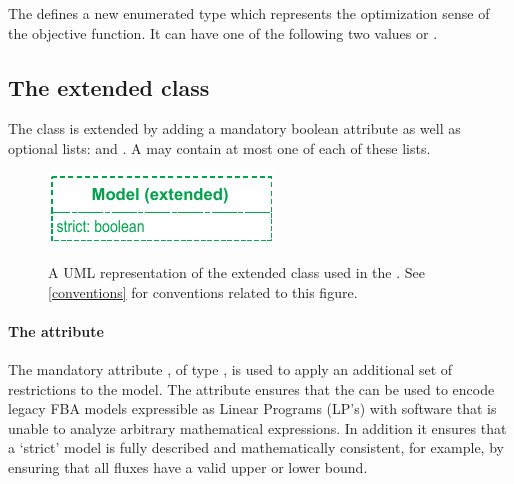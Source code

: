 The \FBCPackage defines a new enumerated type  which
represents the optimization sense of the objective function. It can have one
of the following two values  or .

\newpage
\subsection{The extended  class}
\label{model-class}


The \SBML \Model class is extended by adding a mandatory boolean attribute
 as well as optional lists: %
 and .
A \Model may contain at most one of each of these lists.

\begin{figure}[ht]
  \centering
  \includegraphics[width=6cm]{images/v3harmony_fbc_model.pdf}\\
  \caption{A UML representation of the extended \SBML \Model class used in
  the \FBCPackage. See \ref{conventions} for conventions related to this
  figure.}
  \label{fig:fbc_uml_model}
\end{figure}


%

\paragraph{The attribute }

The mandatory attribute , of type , is used to apply an additional set of restrictions to the model. The  attribute ensures that the \FBCPackage can be used to encode legacy FBA models expressible as Linear Programs (LP's) with software that is unable to analyze arbitrary mathematical expressions. In addition it ensures that a `strict' model is fully described and mathematically consistent, for example, by ensuring that all fluxes have a valid upper or lower bound.

